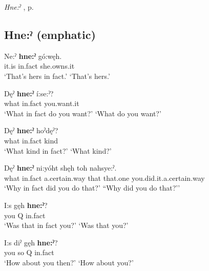 \begin{CayugaRelated}
\item \textit{Hne:ˀ} , p. \pageref{p:[hne:ˀ] ‘in fact’}
\end{CayugaRelated}

\subsection*{\textbf{Hne:ˀ}  (emphatic)} \label{p:[hne:ˀ] ‘in fact’}

\ea
\label{ex:hpar39}
\gll Ne:ˀ \textbf{hne:ˀ} gó:węh.\\
it.is in.fact she.owns.it\\
\glt ‘That’s hers in fact.’ `That’s hers.’
\z


\ea
\label{ex:hpar40}
\gll Dęˀ \textbf{hne:ˀ} í:se:ˀ?\\
what in.fact you.want.it\\
\glt ‘What in fact do you want?’ `What do you want?’
\z


\ea
\label{ex:hpar41}
\gll Dęˀ \textbf{hne:ˀ} hoˀdęˀ?\\
what in.fact kind\\
\glt ‘What kind in fact?’ `What kind?’
\z


\ea
\label{ex:hpar42}
\gll Dęˀ \textbf{hne:ˀ} ni:yóht shęh toh nahsye:ˀ.\\
what in.fact a.certain.way that that.one you.did.it.a.certain.way\\
\glt ‘Why in fact did you do that?’ ``Why did you do that?’’
\z


\ea
\label{ex:hpar43}
\gll I:s gęh \textbf{hne:ˀ}?\\
you Q in.fact\\
\glt ‘Was that in fact you?’ `Was that you?’
\z


\ea
\label{ex:hpar44}
\gll I:s diˀ gęh \textbf{hne:ˀ}?\\
you so Q in.fact\\
\glt ‘How about you then?’ `How about you?’
\z


